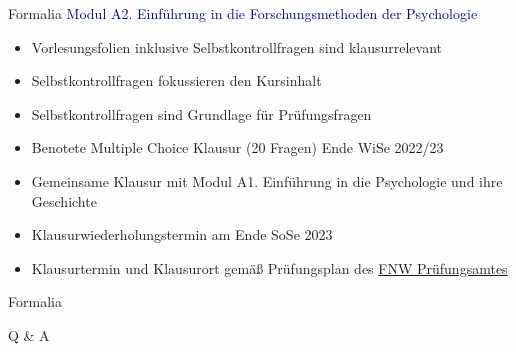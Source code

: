 \documentclass[
  8pt,
  ignorenonframetext,
]{beamer}
\providecommand{\tightlist}{%
  \setlength{\itemsep}{0pt}\setlength{\parskip}{0pt}}
\begin{document}
\begin{frame}{Formalia}
\protect\hypertarget{formalia-5}{}
\textcolor{darkblue}{Modul A2. Einführung in die Forschungsmethoden der Psychologie}

\begin{itemize}
\tightlist
\item
  Vorlesungsfolien inklusive Selbstkontrollfragen sind klausurrelevant
\item
  Selbstkontrollfragen fokussieren den Kursinhalt
\item
  Selbstkontrollfragen sind Grundlage für Prüfungsfragen
\item
  Benotete Multiple Choice Klausur (20 Fragen) Ende WiSe 2022/23
\item
  Gemeinsame Klausur mit Modul A1. Einführung in die Psychologie und
  ihre Geschichte
\item
  Klausurwiederholungstermin am Ende SoSe 2023
\item
  Klausurtermin und Klausurort gemäß Prüfungsplan des
  \href{https://www.fnw.ovgu.de/Studium/Pr\%C3\%BCfungsamt.html}{FNW
  Prüfungsamtes}
\end{itemize}
\end{frame}

\begin{frame}{Formalia}
\protect\hypertarget{formalia-6}{}
\Huge
\vfill
\center

Q \& A \vfill
\end{frame}
\end{document}

